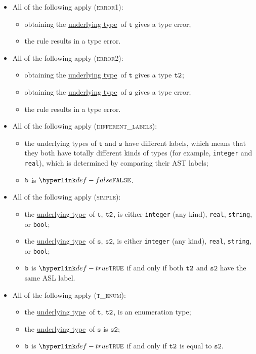 \documentclass{book}
\newcommand\underlyingtype[0]{\hyperlink{def-underlyingtype}{underlying type}}
\newcommand\vt[0]{\texttt{t}}
\newcommand\vs[0]{\texttt{s}}
\newcommand\vstwo[0]{\texttt{s2}}
\begin{document}
\begin{itemize}
\item All of the following apply (\textsc{error1}):
  \begin{itemize}
  \item obtaining the \underlyingtype\ of $\vt$ gives a type error;
  \item the rule results in a type error.
  \end{itemize}

\item All of the following apply (\textsc{error2}):
  \begin{itemize}
    \item obtaining the \underlyingtype\ of $\vt$ gives a type $\texttt{t2}$;
    \item obtaining the \underlyingtype\ of $\vs$ gives a type error;
    \item the rule results in a type error.
    \end{itemize}

\item All of the following apply (\textsc{different\_labels}):
  \begin{itemize}
  \item the underlying types of $\vt$ and $\vs$ have different labels,
  which means that they both have totally different kinds of types (for example, \texttt{integer} and \texttt{real}),
  which is determined by comparing their AST labels;
  \item $\texttt{b}$ is $\False$.
  \end{itemize}

\item All of the following apply (\textsc{simple}):
  \begin{itemize}
  \item the \underlyingtype\ of $\vt$, $\texttt{t2}$, is either \texttt{integer} (any kind), \texttt{real}, \texttt{string}, or \texttt{bool};
  \item the \underlyingtype\ of $\vs$, $\vstwo$, is either \texttt{integer} (any kind), \texttt{real}, \texttt{string}, or \texttt{bool};
  \item $\texttt{b}$ is $\True$ if and only if both $\texttt{t2}$ and $\vstwo$ have the same ASL label.
  \end{itemize}

\item All of the following apply (\textsc{t\_enum}):
  \begin{itemize}
  \item the \underlyingtype\ of $\vt$, $\texttt{t2}$, is an enumeration type;
  \item the \underlyingtype\ of $\vs$ is $\vstwo$;
  \item $\texttt{b}$ is $\True$ if and only if $\texttt{t2}$ is equal to $\vstwo$.
  \end{itemize}


\end{itemize}
\end{document}
